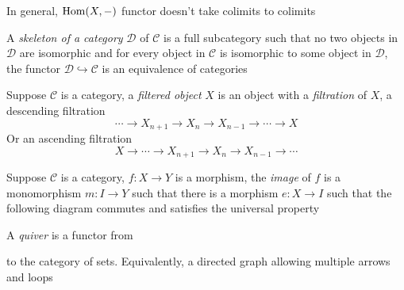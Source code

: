 \documentclass[main]{subfiles}
\begin{document}
\begin{remark}
In general, $\operatorname{Hom}(X,-)$ functor doesn't take colimits to colimits
\end{remark}

\begin{definition}
A \textit{skeleton of a category} $\mathscr D$ of $\mathscr C$ is a full subcategory such that no two objects in $\mathscr D$ are isomorphic and for every object in $\mathscr C$ is isomorphic to some object in $\mathscr D$, the functor $\mathscr D\hookrightarrow\mathscr C$ is an equivalence of categories
\end{definition}

\begin{definition}
Suppose $\mathscr C$ is a category, a \textit{filtered object} $X$ is an object with a \textit{filtration} of $X$, a descending filtration
\[\cdots\to X_{n+1}\to X_n\to X_{n-1}\to\cdots\to X\]
Or an ascending filtration
\[X\to\cdots\to X_{n+1}\to X_n\to X_{n-1}\to\cdots\]
\end{definition}

\begin{definition}
Suppose $\mathscr C$ is a category, $f:X\to Y$ is a morphism, the \textit{image} of $f$ is a monomorphism $m:I\to Y$ such that there is a morphism $e:X\to I$ such that the following diagram commutes and satisfies the universal property
\begin{center}
\end{center}
\end{definition}

\begin{definition}
A \textit{quiver} is a functor from  to the category of sets. Equivalently, a directed graph allowing multiple arrows and loops
\end{definition}
\end{document}
